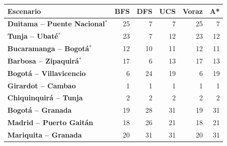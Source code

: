 \renewcommand{\arraystretch}{1.2}
\begin{tabular}{|l|r|r|r|r|r|}
\hline
\rowcolor{gray!20} \textbf{Escenario} & \textbf{BFS} & \textbf{DFS} & \textbf{UCS} & \textbf{Voraz} & \textbf{A*} \\
\hline
\textbf{Duitama -- Puente Nacional$^{*}$} & 25 & 7 & 7 & 25 & 7 \\
\hline
\textbf{Tunja -- Ubaté$^{*}$} & 23 & 7 & 12 & 23 & 12 \\
\hline
\textbf{Bucaramanga -- Bogotá$^{*}$} & 12 & 10 & 11 & 12 & 11 \\
\hline
\textbf{Barbosa -- Zipaquirá$^{*}$} & 17 & 6 & 13 & 17 & 13 \\
\hline
\textbf{Bogotá -- Villavicencio} & 6 & 24 & 19 & 6 & 19 \\
\hline
\textbf{Girardot -- Cambao} & 1 & 1 & 1 & 1 & 1 \\
\hline
\textbf{Chiquinquirá -- Tunja} & 2 & 2 & 2 & 2 & 2 \\
\hline
\textbf{Bogotá -- Granada} & 19 & 28 & 31 & 19 & 31 \\
\hline
\textbf{Madrid -- Puerto Gaitán} & 18 & 26 & 21 & 18 & 21 \\
\hline
\textbf{Mariquita -- Granada} & 20 & 31 & 31 & 20 & 31 \\
\hline
\end{tabular}
